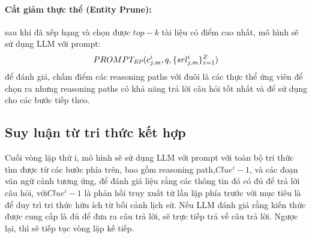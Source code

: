 \paragraph{Cắt giảm thực thể (Entity Prune):} sau khi đã xếp hạng và chọn được $top-k$ tài liệu có điểm cao nhất, mô hình sẽ sử dụng LLM với prompt:
\begin{equation}
    PROMPT_\emph{EP}(c^i_{j,m}, q, \{srl^i_{j,m}\}^Z_{z=1})
    \label{eq:6}
\end{equation}
để đánh giá, chấm điểm các reasoning paths với đuôi là các thực thể ứng viên để chọn ra nhưng reasoning paths có khả năng trả lời câu hỏi tốt nhất và để sử dụng cho các bước tiếp theo.


\subsection{Suy luận từ tri thức kết hợp}
\label{subsection:integrated_reasoning_from_knowledge}
Cuối vòng lặp thứ i, mô hình sẽ sử dụng LLM với prompt với toàn bộ tri thức tìm được từ các bước phía trên, bao gồm reasoning path,$ Clue^i-1$, và các đoạn văn ngữ cảnh tương ứng, để đánh giá liệu rằng các thông tin đó có đủ để trả lời câu hỏi, với$ Clue^i-1$ là phản hồi truy xuất từ lần lặp phía trước với mục tiêu là để duy trì tri thức hữu ích từ bối cảnh lịch sử. Nếu LLM đánh giá rằng kiến thức được cung cấp là đủ để đưa ra câu trả lời, sẽ trực tiếp trả về câu trả lời. Ngược lại, thì sẽ tiếp tục vòng lặp kế tiếp.
